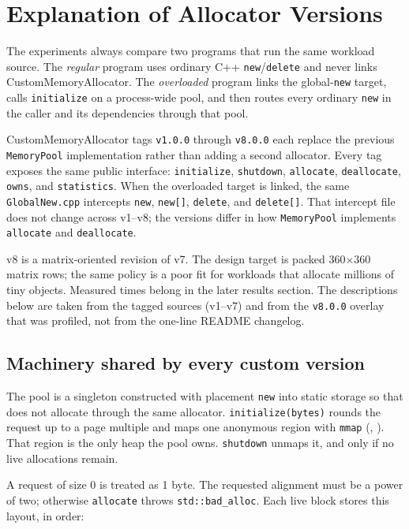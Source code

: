 \section{Explanation of Allocator Versions}
\label{sec:allocator-versions}

The experiments always compare two programs that run the same workload source.
The \emph{regular} program uses ordinary C++ \texttt{new}/\texttt{delete} and
never links CustomMemoryAllocator.
The \emph{overloaded} program links the global-\texttt{new} target, calls
\texttt{initialize} on a process-wide pool, and then routes every ordinary
\texttt{new} in the caller and its dependencies through that pool.

CustomMemoryAllocator tags \texttt{v1.0.0} through \texttt{v8.0.0} each replace
the previous \texttt{MemoryPool} implementation rather than adding a second
allocator.
Every tag exposes the same public interface:
\texttt{initialize}, \texttt{shutdown}, \texttt{allocate}, \texttt{deallocate},
\texttt{owns}, and \texttt{statistics}.
When the overloaded target is linked, the same \texttt{GlobalNew.cpp}
intercepts \texttt{new}, \texttt{new[]}, \texttt{delete}, and \texttt{delete[]}.
That intercept file does not change across v1--v8; the versions differ in how
\texttt{MemoryPool} implements \texttt{allocate} and \texttt{deallocate}.

v8 is a matrix-oriented revision of v7.
The design target is packed 360$\times$360 matrix rows; the same policy is a
poor fit for workloads that allocate millions of tiny objects.
Measured times belong in the later results section.
The descriptions below are taken from the tagged sources (v1--v7) and from the
\texttt{v8.0.0} overlay that was profiled, not from the one-line README
changelog.

\subsection{Machinery shared by every custom version}

The pool is a singleton constructed with placement \texttt{new} into static
storage so that  does not allocate through the
same allocator.
\texttt{initialize(bytes)} rounds the request up to a page multiple and maps one
anonymous region with \texttt{mmap}
(, ).
That region is the only heap the pool owns.
\texttt{shutdown} unmaps it, and only if no live allocations remain.

A request of size 0 is treated as 1 byte.
The requested alignment must be a power of two; otherwise
\texttt{allocate} throws \texttt{std::bad\_alloc}.
Each live block stores this layout, in order:

